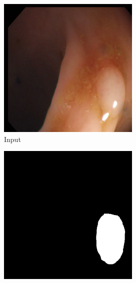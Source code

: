 
\begin{figure}
	\centering
	\begin{subfigure}{.19\textwidth}
		\centering
		\includegraphics[width=.9\linewidth]{img/results/initial_input}
		\caption{Input}
	\end{subfigure}
	\begin{subfigure}{.19\textwidth}
		\centering
		\includegraphics[width=.9\linewidth]{img/results/initial_target}

\end{subfigure}
\end{figure}
